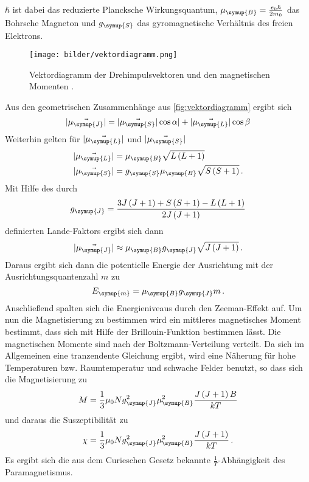 $\hbar$ ist dabei das reduzierte Plancksche Wirkungsquantum, $\mu_{\symup{B}}=\frac{e_{0}\hbar}{2m_{0}}$ das
Bohrsche Magneton und $g_{\symup{S}}$ das gyromagnetische Verhältnis des freien Elektrons.
\begin{figure}
    \centering
    \texttt{[image: bilder/vektordiagramm.png]}
    \caption{Vektordiagramm der Drehimpulsvektoren und den magnetischen Momenten \cite{sample}.}
    \label{fig:vektordiagramm}
\end{figure}
Aus den geometrischen Zusammenhänge aus \autoref{fig:vektordiagramm} ergibt sich
\begin{equation*}
    |\vec{\mu_{\symup{J}}}| = |\vec{\mu_{\symup{S}}}|\cos{\alpha}| + |\vec{\mu_{\symup{L}}}|\cos{\beta}
\end{equation*}
Weiterhin gelten für $|\vec{\mu_{\symup{L}}}|$ und $|\vec{\mu_{\symup{S}}}|$
\begin{align*}
    |\vec{\mu_{\symup{L}}}| &= \mu_{\symup{B}}\sqrt{L\left(L+1\right)} \\
    |\vec{\mu_{\symup{S}}}| &= g_{\symup{S}}\mu_{\symup{B}}\sqrt{S\left(S+1\right)}\,.
\end{align*}
Mit Hilfe des durch
\begin{equation*}
    g_{\symup{J}} = \frac{3J\left(J+1\right) + S\left(S+1\right)- L\left(L+1\right)}{2J\left(J+1\right)}
\end{equation*}
definierten Lande-Faktors ergibt sich dann
\begin{equation*}
    |\vec{\mu_{\symup{J}}}| \approx \mu_{\symup{B}}g_{\symup{J}}\sqrt{J\left(J+1\right)}\,.
\end{equation*}
Daraus ergibt sich dann die potentielle Energie der Ausrichtung mit der Ausrichtungsquantenzahl $m$ zu
\begin{equation}
    E_{\symup{m}} = \mu_{\symup{B}}g_{\symup{J}}m\,.
\end{equation}
Anschließend spalten sich die Energieniveaus durch den Zeeman-Effekt auf. Um nun die Magnetisierung zu bestimmen
wird ein mittleres magnetisches Moment bestimmt, dass sich mit Hilfe der Brillouin-Funktion bestimmen lässt.
Die magnetischen Momente sind nach der Boltzmann-Verteilung verteilt. Da sich im Allgemeinen eine tranzendente
Gleichung ergibt, wird eine Näherung für hohe Temperaturen bzw. Raumtemperatur und schwache Felder benutzt,
so dass sich die Magnetisierung zu
\begin{equation*}
    M = \frac{1}{3}\mu_{0}Ng^{2}_{\symup{J}}\mu^2_{\symup{B}}\frac{J\left(J+1\right)B}{kT}
\end{equation*}
und daraus die Suszeptibilität zu
\begin{equation}
    \chi = \frac{1}{3}\mu_{0}Ng^{2}_{\symup{J}}\mu^2_{\symup{B}}\frac{J\left(J+1\right)}{kT}\,.
\end{equation}
Es ergibt sich die aus dem Curieschen Gesetz bekannte $\frac{1}{T}$-Abhängigkeit des Paramagnetismus.

